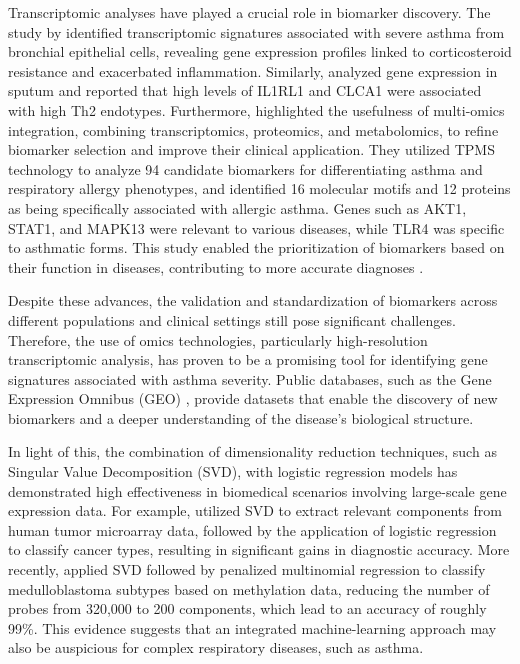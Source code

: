Transcriptomic analyses have played a crucial role in biomarker discovery. The study by %
\cite{modena_gene_2017} identified transcriptomic signatures associated with severe asthma from bronchial epithelial cells, revealing gene expression profiles linked to corticosteroid resistance and exacerbated inflammation. Similarly, %
\cite{bigler_severe_2017} analyzed gene expression in sputum and reported that high levels of IL1RL1 and CLCA1 were associated with high Th2 endotypes. Furthermore, %
\cite{cremades-jimeno_prioritizing_2021} highlighted the usefulness of multi-omics integration, combining transcriptomics, proteomics, and metabolomics, to refine biomarker selection and improve their clinical application. They utilized TPMS technology to analyze 94 candidate biomarkers for differentiating asthma and respiratory allergy phenotypes, and identified 16 molecular motifs and 12 proteins as being specifically associated with allergic asthma. Genes such as AKT1, STAT1, and MAPK13 were relevant to various diseases, while TLR4 was specific to asthmatic forms. This study enabled the prioritization of biomarkers based on their function in diseases, contributing to more accurate diagnoses %
\cite{cremades-jimeno_prioritizing_2021}.

Despite these advances, the validation and standardization of biomarkers across different populations and clinical settings still pose significant challenges. Therefore, the use of omics technologies, particularly high-resolution transcriptomic analysis, has proven to be a promising tool for identifying gene signatures associated with asthma severity. Public databases, such as the Gene Expression Omnibus (GEO) %
\cite{clough_gene_2016}, provide datasets that enable the discovery of new biomarkers and a deeper understanding of the disease's biological structure.

In light of this, the combination of dimensionality reduction techniques, such as Singular Value Decomposition (SVD), with logistic regression models has demonstrated high effectiveness in biomedical scenarios involving large-scale gene expression data. For example, %
\cite{ghosh_singular_2002} utilized SVD to extract relevant components from human tumor microarray data, followed by the application of logistic regression to classify cancer types, resulting in significant gains in diagnostic accuracy. More recently, %
\cite{mohammed_singular_2024} applied SVD followed by penalized multinomial regression to classify medulloblastoma subtypes based on methylation data, reducing the number of probes from 320,000 to 200 components, which lead to an accuracy of roughly 99\%. This evidence suggests that an integrated machine-learning approach may also be auspicious for complex respiratory diseases, such as asthma.

